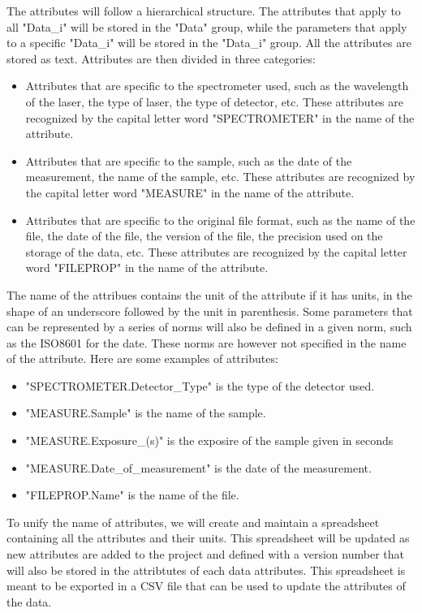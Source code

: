\documentclass{article}
\begin{document}
        The attributes will follow a hierarchical structure. The attributes that apply to all "Data\_i" will be stored in the "Data" group, while the parameters that apply to a specific "Data\_i" will be stored in the "Data\_i" group. All the attributes are stored as text. Attributes are then divided in three categories:
        \begin{itemize}
            \item Attributes that are specific to the spectrometer used, such as the wavelength of the laser, the type of laser, the type of detector, etc. These attributes are recognized by the capital letter word "SPECTROMETER" in the name of the attribute.
            \item Attributes that are specific to the sample, such as the date of the measurement, the name of the sample, etc. These attributes are recognized by the capital letter word "MEASURE" in the name of the attribute.
            \item Attributes that are specific to the original file format, such as the name of the file, the date of the file, the version of the file, the precision used on the storage of the data, etc. These attributes are recognized by the capital letter word "FILEPROP" in the name of the attribute.
        \end{itemize}

        The name of the attribues contains the unit of the attribute if it has units, in the shape of an underscore followed by the unit in parenthesis. Some parameters that can be represented by a series of norms will also be defined in a given norm, such as the ISO8601 for the date. These norms are however not specified in the name of the attribute. Here are some examples of attributes:
        \begin{itemize}
            \item "SPECTROMETER.Detector\_Type" is the type of the detector used.
            \item "MEASURE.Sample" is the name of the sample.
            \item "MEASURE.Exposure\_(s)" is the exposire of the sample given in seconds
            \item "MEASURE.Date\_of\_measurement" is the date of the measurement. 
            \item "FILEPROP.Name" is the name of the file.
        \end{itemize}

        To unify the name of attributes, we will create and maintain a spreadsheet containing all the attributes and their units. This spreadsheet will be updated as new attributes are added to the project and defined with a version number that will also be stored in the attribtutes of each data attributes. This spreadsheet is meant to be exported in a CSV file that can be used to update the attributes of the data.
\end{document}
